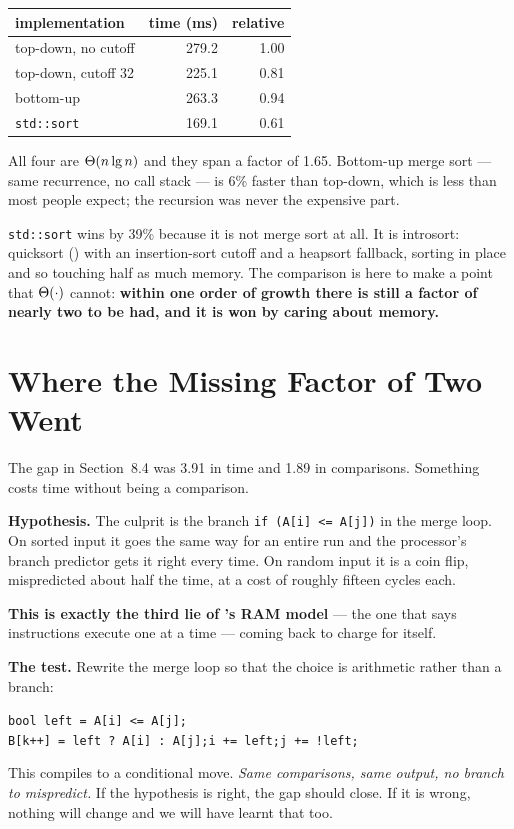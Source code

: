 \begin{worked}
\begin{center}
\begin{tabular}{@{}lrr@{}}
\toprule
\rowcolor{primary!15}
implementation & time (ms) & relative \\
\midrule
top-down, no cutoff & 279.2 & 1.00 \\
top-down, cutoff 32 & 225.1 & 0.81 \\
bottom-up           & 263.3 & 0.94 \\
\texttt{std::sort}  & 169.1 & 0.61 \\
\bottomrule
\end{tabular}
\end{center}

\smallskip
All four are $\Theta(n\operatorname{lg} n)$ and they span a factor of 1.65. Bottom-up merge
sort --- same recurrence, no call stack --- is 6\% faster than top-down, which
is less than most people expect; the recursion was never the expensive part.

\smallskip
\texttt{std::sort} wins by 39\% because it is not merge sort at all. It is
introsort: quicksort () with an insertion-sort cutoff and a
heapsort fallback, sorting in place and so touching half as much memory. The
comparison is here to make a point that $\Theta(\cdot)$ cannot: \textbf{within
one order of growth there is still a factor of nearly two to be had, and it is
won by caring about memory.}
\end{worked}

\section{Where the Missing Factor of Two Went}

The gap in Section~8.4 was 3.91 in time and 1.89 in comparisons. Something
costs time without being a comparison.

\begin{conceptbox}
\textbf{Hypothesis.} The culprit is the branch \texttt{if (A[i] <= A[j])} in
the merge loop. On sorted input it goes the same way for an entire run and the
processor's branch predictor gets it right every time. On random input it is a
coin flip, mispredicted about half the time, at a cost of roughly fifteen
cycles each.

\smallskip
\textbf{This is exactly the third lie of 's RAM model} --- the one
that says instructions execute one at a time --- coming back to charge for
itself.

\smallskip
\textbf{The test.} Rewrite the merge loop so that the choice is arithmetic
rather than a branch:
\begin{center}
\texttt{bool left = A[i] <= A[j];} \\
\texttt{B[k++] = left ? A[i] : A[j];\quad i += left;\quad j += !left;}
\end{center}
This compiles to a conditional move. \emph{Same comparisons, same output, no
branch to mispredict.} If the hypothesis is right, the gap should close. If it
is wrong, nothing will change and we will have learnt that too.
\end{conceptbox}

